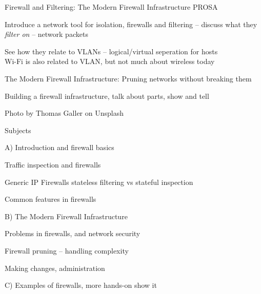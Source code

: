 \documentclass[Screen16to9,17pt]{foils}
\begin{document}
\mytitlepage
{Firewall and Filtering: The Modern Firewall Infrastructure}
{PROSA}


\hlkprofiluk




\begin{list2}
\item Introduce a network tool for isolation, firewalls and filtering -- discuss what they \emph{filter on} -- network packets
\item See how they relate to VLANs -- logical/virtual seperation for hosts\\
Wi-Fi is also related to VLAN, but not much about wireless today
\item The Modern Firewall Infrastructure: Pruning networks without breaking them
\item Building a firewall infrastructure, talk about parts, show and tell
\end{list2}

\hfill {\small Photo by Thomas Galler on Unsplash}



\begin{list1}
\item Subjects
\item A) Introduction and firewall basics
\begin{list2}
\item Traffic inspection and firewalls
\item Generic IP Firewalls stateless filtering vs stateful inspection
\item Common features in firewalls
\end{list2}
\item B) The Modern Firewall Infrastructure
\begin{list2}
\item Problems in firewalls, and network security
\item Firewall pruning -- handling complexity
\item Making changes, administration
\end{list2}
\item C) Examples of firewalls, more hands-on show it
\end{list1}

\end{document}
